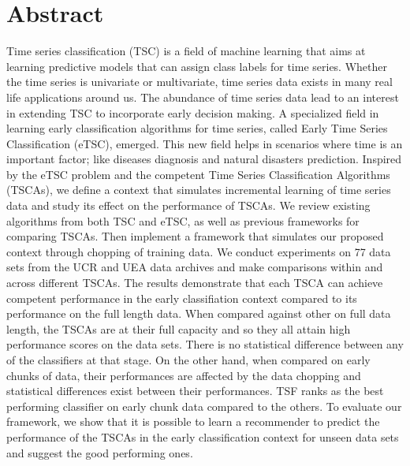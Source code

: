 
\setcounter{page}{1}
\section*{Abstract}
\thispagestyle{empty}
Time series classification (TSC) is a field of machine learning that aims at learning predictive models that can assign class labels for time series.
Whether the time series is univariate or multivariate, time series data exists in many real life applications around us.
The abundance of time series data lead to an interest in extending TSC to incorporate early decision making.
A specialized field in learning early classification algorithms for time series, called Early Time Series Classification (eTSC), emerged.
This new field helps in scenarios where time is an important factor; like diseases diagnosis and natural disasters prediction.
Inspired by the eTSC problem and the competent Time Series Classification Algorithms (TSCAs), we define a context that simulates incremental learning of time series data and study its effect on the performance of TSCAs.
We review existing algorithms from both TSC and eTSC, as well as previous frameworks for comparing TSCAs.
Then implement a framework that simulates our proposed context through chopping of training data.
We conduct experiments on 77 data sets from the UCR and UEA data archives and make comparisons within and across different TSCAs.
The results demonstrate that each TSCA can achieve competent performance in the early classifiation context compared to its performance on the full length data.
When compared against other on full data length, the TSCAs are at their full capacity and so they all attain high performance scores on the data sets.
There is no statistical difference between any of the classifiers at that stage.
On the other hand, when compared on early chunks of data, their performances are affected by the data chopping and statistical differences exist between their performances.
TSF ranks as the best performing classifier on early chunk data compared to the others.
To evaluate our framework, we show that it is possible to learn a recommender to predict the performance of the TSCAs in the early classification context for unseen data sets
and suggest the good performing ones.

\null\newpage

